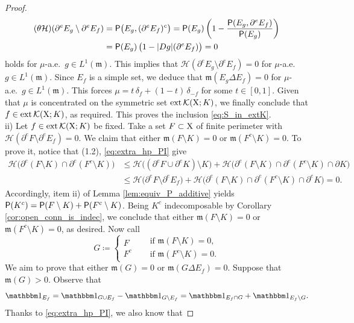 \documentclass[reqno]{amsart}
\numberwithin{equation}{section}
\newcommand{\X}{{\rm X}}
\newcommand{\mm}{\mathfrak m}
\newcommand{\1}{\mathbbm 1}
\renewcommand{\P}{{\sf P}}
\renewcommand{\H}{{\mathcal H}}
\begin{document}
\begin{proof}
\[\begin{split}
(\theta\H)(\partial^e E_g\setminus\partial^e E_f)&=\P\big(E_g,(\partial^e E_f)^c\big)
=\P(E_g)\,\bigg(1-\frac{\P(E_g,\partial^e E_f)}{\P(E_g)}\bigg)\\
&=\P(E_g)\,\big(1-|Dg|(\partial^e E_f)\big)=0
\end{split}\]
holds for \(\mu\)-a.e.\ \(g\in L^1(\mm)\). This implies that
\(\H(\partial^e E_g\setminus\partial^e E_f)=0\) for \(\mu\)-a.e.\ \(g\in L^1(\mm)\).
Since \(E_f\) is a simple set, we deduce that \(\mm(E_g\Delta E_f)=0\) for
\(\mu\)-a.e.\ \(g\in L^1(\mm)\). This forces \(\mu=t\,\delta_f+(1-t)\,\delta_{-f}\)
for some \(t\in[0,1]\). Given that \(\mu\) is concentrated on the symmetric set
\({\rm ext}\,\mathcal K(\X;K)\), we finally conclude that
\(f\in{\rm ext}\,\mathcal K(\X;K)\), as required. This proves the
inclusion \eqref{eq:S_in_extK}.\\
{\color{blue}ii)} Let \(f\in{\rm ext}\,\mathcal K(\X;K)\) be fixed.
Take a set \(F\subset\X\) of finite perimeter with
\(\H(\partial^e F\setminus\partial^e E_f)=0\). We claim that either
\(\mm(F\setminus K)=0\) or \(\mm(F^c\setminus K)=0\). To prove it,
notice that {\color{red}(1.2)}, \eqref{eq:extra_hp_PI} give
\[\begin{split}
\H\big(\partial^e(F\setminus K)\cap\partial^e(F^c\setminus K)\big)
&\leq\H\big((\partial^e F\cup\partial^e K)\setminus K\big)+
\H\big(\partial^e(F\setminus K)\cap\partial^e(F^c\setminus K)\cap\partial K\big)\\
&\leq\H\big(\partial^e F\setminus\partial^e E_f\big)+
\H\big(\partial^e(F\setminus K)\cap\partial^e(F^c\setminus K)\cap\partial^e K\big)=0.
\end{split}\]
Accordingly, item ii) of Lemma \ref{lem:equiv_P_additive} yields
\(\P(K^c)=\P(F\setminus K)+\P(F^c\setminus K)\). Being \(K^c\) indecomposable
by Corollary \ref{cor:open_conn_is_indec}, we conclude that either
\(\mm(F\setminus K)=0\) or \(\mm(F^c\setminus K)=0\), as desired. Now call
\[
G\coloneqq\left\{\begin{array}{ll}
F\\
F^c
\end{array}\quad\begin{array}{ll}
\text{ if }\mm(F\setminus K)=0,\\
\text{ if }\mm(F^c\setminus K)=0.
\end{array}\right.
\]
We aim to prove that either \(\mm(G)=0\) or \(\mm(G\Delta E_f)=0\).
Suppose that \(\mm(G)>0\). Observe that
\[
\1_{E_f}=\1_{G\cup E_f}-\1_{G\setminus E_f}=\1_{E_f\cap G}+\1_{E_f\setminus G}.
\]
Thanks to \eqref{eq:extra_hp_PI}, we also know that

\end{proof}
\end{document}
